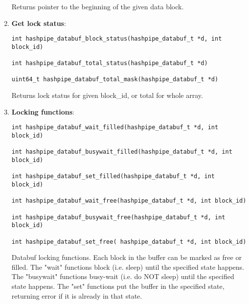 \documentclass[12pt]{article}
\begin{document}
\begin{enumerate}
Returns pointer to the beginning of the given data block.

\item {\bf Get lock status}:

\begin{lstlisting}
int hashpipe_databuf_block_status(hashpipe_databuf_t *d, int block_id)

int hashpipe_databuf_total_status(hashpipe_databuf_t *d)

uint64_t hashpipe_databuf_total_mask(hashpipe_databuf_t *d)
\end{lstlisting}

Returns lock status for given block\_id, or total for whole array.

\item {\bf Locking functions}:

\begin{lstlisting}
int hashpipe_databuf_wait_filled(hashpipe_databuf_t *d, int block_id)

int hashpipe_databuf_busywait_filled(hashpipe_databuf_t *d, int block_id)

int hashpipe_databuf_set_filled(hashpipe_databuf_t *d, int block_id)

int hashpipe_databuf_wait_free(hashpipe_databuf_t *d, int block_id)

int hashpipe_databuf_busywait_free(hashpipe_databuf_t *d, int block_id)

int hashpipe_databuf_set_free( hashpipe_databuf_t *d, int block_id)
\end{lstlisting}

Databuf locking functions.  Each block in the buffer
can be marked as free or filled.  The "wait" functions
block (i.e. sleep) until the specified state happens.
The "busywait" functions busy-wait (i.e. do NOT sleep)
until the specified state happens.  The "set" functions
put the buffer in the specified state, returning error if
it is already in that state.

\end{enumerate}
\end{document}
